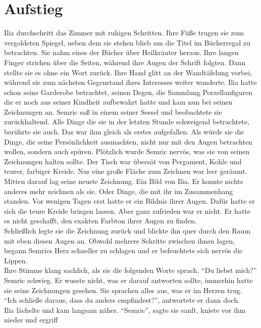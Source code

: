 \chapter{Aufstieg}

Ilia durchschritt das Zimmer mit ruhigen Schritten. Ihre Füße trugen sie zum vergoldeten Spiegel, 
neben dem sie stehen blieb um die Titel im Bücherregal zu betrachten. Sie nahm eines der Bücher 
über Heilkräuter heraus. Ihre langen Finger strichen über die Seiten, während ihre Augen der 
Schrift folgten. Dann stellte sie es ohne ein Wort zurück. Ihre Hand glitt an der Wandtäfelung 
vorbei, während sie zum nächsten Gegenstand ihres Interesses weiter wanderte. Ilia hatte schon 
seine Garderobe betrachtet, seinen Degen, die Sammlung Porzellanfiguren die er noch aus seiner 
Kindheit aufbewahrt hatte und kam nun bei seinen Zeichnungen an. Semric saß in einem seiner Sessel 
und beobachtete sie zurückhaltend. Alle Dinge die sie in der letzten Stunde schweigend betrachtete, 
berührte sie auch. Das war ihm gleich als erstes aufgefallen. Als würde sie die Dinge, die seine 
Persönlichkeit ausmachten, nicht nur mit den Augen betrachten wollen, sondern auch spüren. 
Plötzlich wurde Semric nervös, was sie von seinen Zeichnungen halten sollte. Der Tisch war übersät 
von Pergament, Kohle und teurer, farbiger Kreide. Nur eine große Fläche zum Zeichnen war 
leer geräumt. Mitten darauf lag seine neuste Zeichnung. Ein Bild von Ilia. Er konnte nichts anderes 
mehr zeichnen als sie. Oder Dinge, die mit ihr im Zusammenhang standen. Vor wenigen Tagen erst 
hatte er ein Bildnis ihrer Augen. Dafür hatte er sich die teure Kreide bringen lassen. Aber ganz 
zufrieden war er nicht. Er hatte es nicht geschafft, den exakten Farbton ihrer Augen zu finden.\\
Schließlich legte sie die Zeichnung zurück und blickte ihn quer durch den Raum mit eben diesen 
Augen an. Obwohl mehrere Schritte zwischen ihnen lagen, begann Semrics Herz schneller zu schlagen 
und er befeuchtete sich nervös die Lippen.\\
Ihre Stimme klang sachlich, als sie die folgenden Worte sprach. ``Du liebst mich?''\\
Semric schwieg. Er wusste nicht, was er darauf antworten sollte, immerhin hatte sie seine 
Zeichnungen gesehen. Sie sprachen alles aus, was er im Herzen trug.\\
``Ich schließe daraus, dass du anders empfindest?'', antwortete er dann doch.\\
Ilia lächelte und kam langsam näher. ``Semric'', sagte sie sanft, kniete vor ihm nieder und ergriff 
